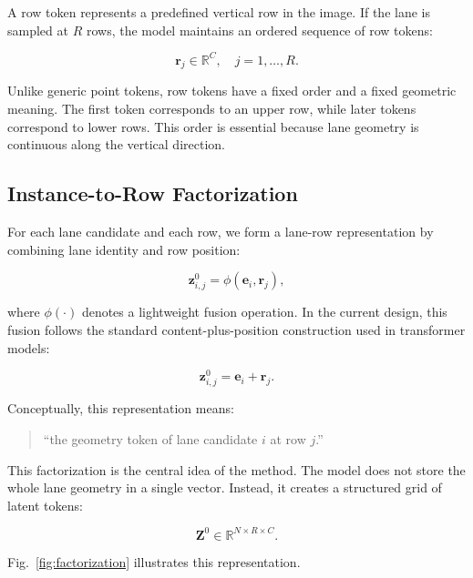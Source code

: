 \documentclass[conference]{IEEEtran}
\begin{document}
A row token represents a predefined vertical row in the image. If the lane is sampled at $R$ rows, the model maintains an ordered sequence of row tokens:

\begin{equation}
    \mathbf{r}_j \in \mathbb{R}^{C}, \quad j=1,\dots,R.
\end{equation}

Unlike generic point tokens, row tokens have a fixed order and a fixed geometric meaning. The first token corresponds to an upper row, while later tokens correspond to lower rows. This order is essential because lane geometry is continuous along the vertical direction.

\subsection{Instance-to-Row Factorization}

For each lane candidate and each row, we form a lane-row representation by combining lane identity and row position:

\begin{equation}
    \mathbf{z}_{i,j}^{0} = \phi(\mathbf{e}_i, \mathbf{r}_j),
\end{equation}

where $\phi(\cdot)$ denotes a lightweight fusion operation. In the current design, this fusion follows the standard content-plus-position construction used in transformer models:

\begin{equation}
    \mathbf{z}_{i,j}^{0} = \mathbf{e}_i + \mathbf{r}_j.
    \label{eq:addition}
\end{equation}

Conceptually, this representation means:

\begin{quote}
``the geometry token of lane candidate $i$ at row $j$.''
\end{quote}

This factorization is the central idea of the method. The model does not store the whole lane geometry in a single vector. Instead, it creates a structured grid of latent tokens:

\begin{equation}
    \mathbf{Z}^{0} \in \mathbb{R}^{N \times R \times C}.
\end{equation}

Fig.~\ref{fig:factorization} illustrates this representation.
\end{document}
